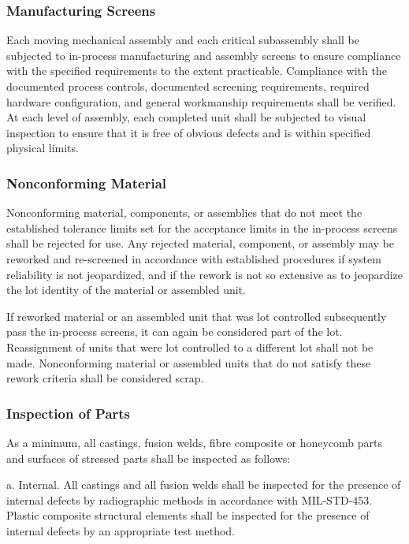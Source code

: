 \documentclass[12pt]{article}
\begin{document}
\subsubsection{Manufacturing Screens} %
Each moving mechanical assembly and each critical subassembly shall be subjected to in-process manufacturing and assembly screens to ensure compliance with the specified requirements to the extent practicable. 
Compliance with the documented process controls, documented screening requirements, required hardware configuration, and general workmanship requirements shall be verified. 
At each level of assembly, each completed unit shall be subjected to visual inspection to ensure that it is free of obvious defects and is within specified physical limits.

\subsubsection{Nonconforming Material} %
Nonconforming material, components, or assemblies that do not meet the established tolerance limits set for the acceptance limits in the in-process screens shall be rejected for use. 
Any rejected material, component, or assembly may be reworked and re-screened in accordance with established procedures if system reliability is not jeopardized, and if the rework is not so extensive as to jeopardize the lot identity of the material or assembled unit.

If reworked material or an assembled unit that was lot controlled subsequently pass the in-process screens, it can again be considered part of the lot. 
Reassignment of units that were lot controlled to a different lot shall not be made.
Nonconforming material or assembled units that do not satisfy these rework criteria shall be considered scrap.

\subsubsection{Inspection of Parts} %
As a minimum, all castings, fusion welds, fibre composite or honeycomb parts and surfaces of stressed parts shall be inspected as follows:

a. Internal. 
All castings and all fusion welds shall be inspected for the presence of internal defects by radiographic methods in accordance with MIL-STD-453. 
Plastic composite structural elements shall be inspected for the presence of internal defects by an appropriate test method.
\end{document}
